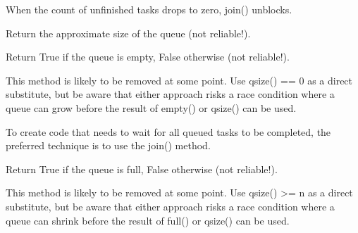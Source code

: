 \documentclass[letterpaper,10pt,english]{sphinxmanual}
\begin{document}
\begin{fulllineitems}
\begin{fulllineitems}
\sphinxAtStartPar
When the count of unfinished tasks drops to zero, join() unblocks.

\end{fulllineitems}


\begin{fulllineitems}
\label{\detokenize{queue:queue.Queue.qsize}}
\pysigstartsignatures
{}
\pysigstopsignatures
\sphinxAtStartPar
Return the approximate size of the queue (not reliable!).

\end{fulllineitems}


\begin{fulllineitems}
\label{\detokenize{queue:queue.Queue.empty}}
\pysigstartsignatures
{}
\pysigstopsignatures
\sphinxAtStartPar
Return True if the queue is empty, False otherwise (not reliable!).

\sphinxAtStartPar
This method is likely to be removed at some point.  Use qsize() == 0
as a direct substitute, but be aware that either approach risks a race
condition where a queue can grow before the result of empty() or
qsize() can be used.

\sphinxAtStartPar
To create code that needs to wait for all queued tasks to be
completed, the preferred technique is to use the join() method.

\end{fulllineitems}


\begin{fulllineitems}
\label{\detokenize{queue:queue.Queue.full}}
\pysigstartsignatures
{}
\pysigstopsignatures
\sphinxAtStartPar
Return True if the queue is full, False otherwise (not reliable!).

\sphinxAtStartPar
This method is likely to be removed at some point.  Use qsize() \textgreater{}= n
as a direct substitute, but be aware that either approach risks a race
condition where a queue can shrink before the result of full() or
qsize() can be used.


\end{fulllineitems}
\end{fulllineitems}
\end{document}
